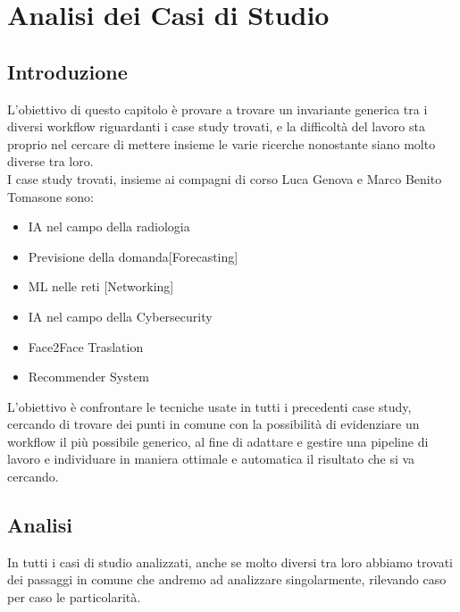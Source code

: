 \documentclass[../tesi.tex]{subfiles}
\begin{document}
\chapter{Analisi dei Casi di Studio}
\section{Introduzione}
L’obiettivo di questo capitolo è provare a trovare un invariante generica tra i diversi workflow riguardanti i case study trovati, e la difficoltà del lavoro sta proprio nel cercare di mettere insieme le varie ricerche nonostante siano molto diverse tra loro.\\
I case study trovati, insieme ai compagni di corso Luca Genova e Marco Benito Tomasone sono:
\begin{itemize}
  \item IA nel campo della radiologia
  \item	Previsione della domanda[Forecasting]
  \item ML nelle reti [Networking]
  \item	IA nel campo della Cybersecurity
  \item Face2Face Traslation
  \item	Recommender System 
\end{itemize}
L’obiettivo è confrontare le tecniche usate in tutti i precedenti case study, cercando di trovare dei punti in comune con la possibilità di evidenziare un workflow il più possibile generico, al fine di adattare e gestire una pipeline di lavoro e individuare in maniera ottimale e automatica il risultato che si va cercando.
\section{Analisi}
In tutti i casi di studio analizzati, anche se molto diversi tra loro abbiamo trovati dei passaggi in comune che andremo ad analizzare singolarmente, rilevando caso per caso le particolarità.
\end{document}

